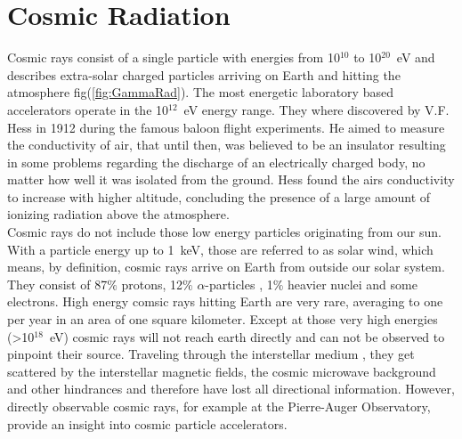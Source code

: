 \documentclass[12pt,article,type=msc,colorback,accentcolor=tud9c]{tudthesis}
\begin{document}
\clearpage
\listoffigures

\clearpage
\tableofcontents


\clearpage
\section{\Large Cosmic Radiation}

%
\begin{figure}[!b] %
\begin{centering}
}
\caption[Cosmic radiation]{Gamma radiation photons (yellow) and scattered cosmic ray protons (blue) from an astrophysical source arriving on Earth. Neutrinos (grey) mostly do not interact. Picture from \cite{ungCTA}}
\label{fig:GammaRad}
\end{centering}
\end{figure}
\noindent
Cosmic rays consist of a single particle with energies from 10$^{10}$ to 10$^{20}$~eV and describes extra-solar charged particles arriving on Earth and hitting the atmosphere fig(\ref{fig:GammaRad}). The most energetic laboratory based accelerators operate in the 10$^{12}$~eV energy range. They where discovered by V.F. Hess in 1912 during the famous baloon flight experiments. He aimed to measure the conductivity of air, that until then, was believed to be an insulator resulting in some problems regarding the discharge of an electrically charged body, no matter how well it was isolated from the ground. Hess found the airs conductivity to increase with higher altitude, concluding the presence of a large amount of ionizing radiation above the atmosphere. \\
\noindent
Cosmic rays do not include those low energy particles originating from our sun. With a particle energy up to 1~keV, those are referred to as solar wind, which means, by definition, cosmic rays arrive on Earth from outside our solar system. They consist of 87$\%$ protons, 12$\%$ $\alpha$-particles , 1$\%$ heavier nuclei and some electrons. High energy comsic rays hitting Earth are very rare, averaging to one per year in an area of one square kilometer. Except at those very high energies (>10$^{18}$~eV) cosmic rays will not reach earth directly and can not be observed to pinpoint their source. Traveling through the interstellar medium , they get scattered by the interstellar magnetic fields, the cosmic microwave background and other hindrances and therefore have lost all directional information. However, directly observable cosmic rays, for example at the Pierre-Auger Observatory, provide an insight into cosmic particle accelerators.\cite{CTADesign}\\
\end{document}
